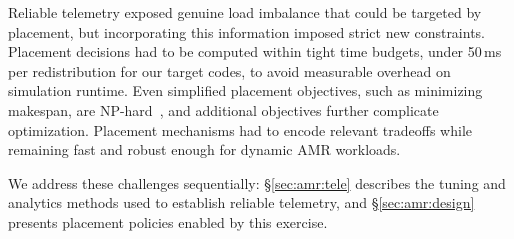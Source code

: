 Reliable telemetry exposed genuine load imbalance that could be targeted by placement, but
incorporating this information imposed strict new constraints.
Placement decisions had to be computed within tight time budgets, under 50\,ms per redistribution
for our target codes, to avoid measurable overhead on simulation runtime.
Even simplified placement objectives, such as minimizing makespan, are
NP-hard~\cite{Garey1979:Intractability}, and additional objectives further complicate optimization.
Placement mechanisms had to encode relevant tradeoffs while remaining fast and robust enough for
dynamic AMR workloads.

We address these challenges sequentially: \S\ref{sec:amr:tele} describes the 
tuning and analytics methods
 used to establish reliable telemetry, and \S\ref{sec:amr:design} presents placement
policies enabled by this exercise.
